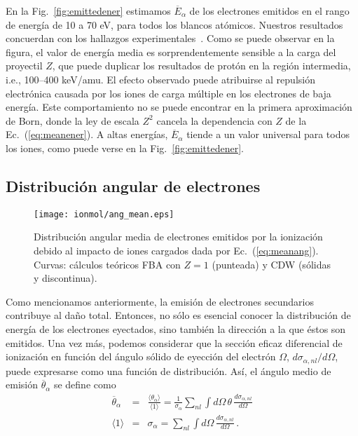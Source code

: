 En la Fig.~\ref{fig:emittedener} estimamos $\overline{E}_{\alpha}$ de los 
electrones emitidos en el rango de energía de 10 a 70 eV, para todos los 
blancos atómicos. Nuestros resultados concuerdan con los hallazgos 
experimentales~\cite{surdutovic2018}. Como se puede observar en la 
figura, el valor de energía media es sorprendentemente sensible a la 
carga del proyectil $Z$, que puede duplicar los resultados de protón en 
la región intermedia, i.e., 100--400 keV/amu. El efecto observado puede 
atribuirse al repulsión electrónica causada por los iones de carga 
múltiple en los electrones de baja energía. Este comportamiento no se 
puede encontrar en la primera aproximación de Born, donde la ley de 
escala $Z^2$ cancela la dependencia con $Z$ de la Ec.~(\ref{eq:meanener}).
A altas energías, $\overline{E}_{\alpha}$ tiende a un valor universal 
para todos los iones, como puede verse en la Fig.~\ref{fig:emittedener}.

\subsection{Distribución angular de electrones}
\label{subsec:meanang}

\begin{figure}
\centering
\texttt{[image: ionmol/ang\_mean.eps]}
\caption[Distribución angular media de electrones emitidos.]
{Distribución angular media de electrones emitidos por la ionización 
debido al impacto de iones cargados dada por Ec.~(\ref{eq:meanang}). 
Curvas: cálculos teóricos FBA con $Z=1$ (punteada) y CDW (sólidas y 
discontinua).}
\label{fig:emittedang}
\end{figure} 

Como mencionamos anteriormente, la emisión de electrones secundarios 
contribuye al daño total. Entonces, no sólo es esencial conocer la 
distribución de energía de los electrones eyectados, sino también la 
dirección a la que éstos son emitidos. Una vez más, podemos considerar 
que la sección eficaz diferencial de ionización en función del ángulo 
sólido de eyección del electrón $\Omega$, $d\sigma_{\alpha,nl}/d\Omega$, 
puede expresarse como una función de distribución. Así, el ángulo medio 
de emisión $\overline{\theta}_{\alpha}$ se define como
\begin{eqnarray}
\overline{\theta}_{\alpha}&=&\frac{\langle\theta_{\alpha}\rangle}
{\langle 1\rangle}=\frac{1}{\sigma_{\alpha}}\sum\limits_{nl}
\int d\Omega\,\theta\,\frac{d\sigma_{\alpha,nl}}{d\Omega} 
\label{eq:meanang} \\
\langle 1\rangle &=&\sigma_{\alpha}=\sum\limits_{nl}\int d\Omega\,
\frac{d\sigma_{\alpha,nl}}{d\Omega}\,.
\end{eqnarray}


